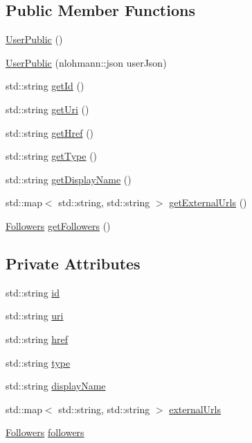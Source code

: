 \subsection*{Public Member Functions}
\begin{DoxyCompactItemize}
\item 
\mbox{\hyperlink{class_user_public_ac3e65a9ba0268bd28b5a38b7f6e6e6e0}{User\+Public}} ()
\item 
\mbox{\hyperlink{class_user_public_a1f0517916adfe698bcb7aa7e446615e5}{User\+Public}} (nlohmann\+::json user\+Json)
\item 
std\+::string \mbox{\hyperlink{class_user_public_ad7f4dfca9b262062b8679a58017fcf57}{get\+Id}} ()
\item 
std\+::string \mbox{\hyperlink{class_user_public_a0f5b55782cec3e2116726fe74f585974}{get\+Uri}} ()
\item 
std\+::string \mbox{\hyperlink{class_user_public_aaf900e9b9d4ceb7da738fa66123bec32}{get\+Href}} ()
\item 
std\+::string \mbox{\hyperlink{class_user_public_a4745f7124b3d9fde0db4a2bde510481d}{get\+Type}} ()
\item 
std\+::string \mbox{\hyperlink{class_user_public_a885fcf27d03450f3fa0de0ea471e0e33}{get\+Display\+Name}} ()
\item 
std\+::map$<$ std\+::string, std\+::string $>$ \mbox{\hyperlink{class_user_public_a377b6b1564d785656386225d5ba6be0a}{get\+External\+Urls}} ()
\item 
\mbox{\hyperlink{class_followers}{Followers}} \mbox{\hyperlink{class_user_public_a67438a95a75f06f86616eb25d3e4f254}{get\+Followers}} ()
\end{DoxyCompactItemize}
\subsection*{Private Attributes}
\begin{DoxyCompactItemize}
\item 
std\+::string \mbox{\hyperlink{class_user_public_ad16ed154d238827cd19a25fdffa662f7}{id}}
\item 
std\+::string \mbox{\hyperlink{class_user_public_ad06637401887e91a8c6c1a9ed9f582a0}{uri}}
\item 
std\+::string \mbox{\hyperlink{class_user_public_a804638a701afff8a4e2ee7167095d52f}{href}}
\item 
std\+::string \mbox{\hyperlink{class_user_public_aefc81debb992d7c4123d4bb6633b82f8}{type}}
\item 
std\+::string \mbox{\hyperlink{class_user_public_a776a646494dd1aed6bc2cb4cc461f871}{display\+Name}}
\item 
std\+::map$<$ std\+::string, std\+::string $>$ \mbox{\hyperlink{class_user_public_a90cba03790b8c1338a4440066783a5ce}{external\+Urls}}
\item 
\mbox{\hyperlink{class_followers}{Followers}} \mbox{\hyperlink{class_user_public_a18186d35cce4138ab02bf56b01bd475d}{followers}}
\end{DoxyCompactItemize}


